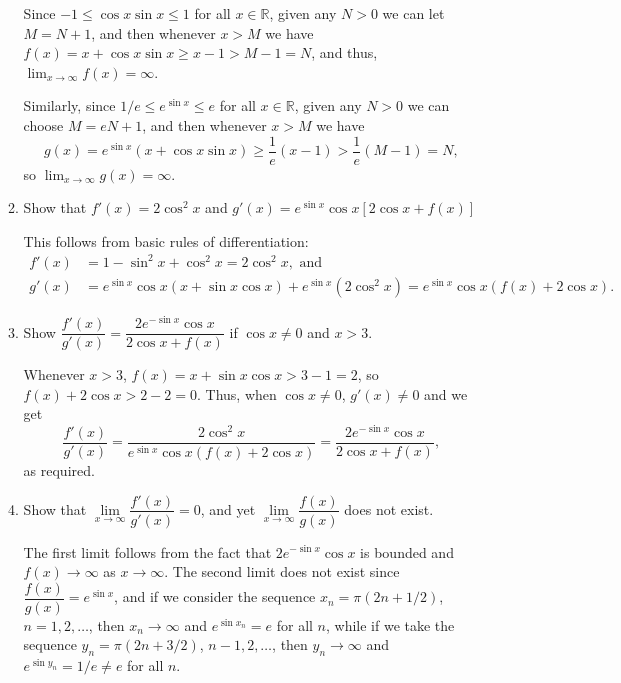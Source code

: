 \documentclass[letterpaper,12pt]{article}
\newcommand{\R}{\mathbb{R}}
\begin{document}
\begin{enumerate}
\begin{enumerate}
 \bigskip
 
 Since $-1\leq \cos x\sin x\leq 1$ for all $x\in \R$, given any $N>0$ we can let $M=N+1$, and then whenever $x>M$ we have $f(x)=x+\cos x\sin x\geq x-1 >M-1=N$, and thus, $\lim_{x\to\infty}f(x)=\infty$.
 
 Similarly, since $1/e\leq e^{\sin x}\leq e$ for all $x\in \R$, given any $N>0$ we can choose $M=eN+1$, and then whenever $x>M$ we have
 \[
 g(x) = e^{\sin x}(x +\cos x\sin x) \geq \frac{1}{e}(x-1)> \frac{1}{e}(M-1)=N,
 \]
 so $\lim_{x\to \infty}g(x)=\infty$.
 
 \bigskip
 
 \item Show that $f'(x)=2\cos^2x$ and $g'(x)=e^{\sin x}\cos x[2\cos x+f(x)]$
 
 \bigskip
 
This follows from basic rules of differentiation:
\begin{align*}
f'(x) &= 1-\sin^2x+\cos^2x = 2\cos^2x,\text{ and }\\
g'(x) &= e^{\sin x}\cos x(x+\sin x\cos x) + e^{\sin x}(2\cos^2 x) = e^{\sin x}\cos x(f(x)+2\cos x).
\end{align*}
 
 \bigskip
 
 \item Show $\dfrac{f'(x)}{g'(x)} = \dfrac{2e^{-\sin x}\cos x}{2\cos x+f(x)}$ if $\cos x\neq 0$ and $x>3$.
 
 \bigskip
 
 Whenever $x>3$, $f(x)=x+\sin x\cos x>3-1=2$, so $f(x)+2\cos x>2-2=0$. Thus, when $\cos x\neq 0$, $g'(x)\neq 0$ and we get
 \[
 \frac{f'(x)}{g'(x)} = \frac{2\cos^2 x}{e^{\sin x}\cos x(f(x)+2\cos x)} = \frac{2e^{-\sin x}\cos x}{2\cos x+f(x)},
 \]
 as required. 
 
 \bigskip
 
 \item Show that $\lim\limits_{x\to\infty}\dfrac{f'(x)}{g'(x)}=0$, and yet $\lim\limits_{x\to\infty}\dfrac{f(x)}{g(x)}$ does not exist.
 
 \bigskip
 
 The first limit follows from the fact that $2e^{-\sin x}\cos x$ is bounded and $f(x)\to \infty$ as $x\to \infty$. The second limit does not exist since $\dfrac{f(x)}{g(x)} = e^{\sin x}$, and if we consider the sequence $x_n = \pi(2n+1/2)$, $n=1,2,\ldots$, then $x_n\to\infty$ and $e^{\sin x_n} = e$ for all $n$, while if we take the sequence $y_n = \pi(2n+3/2)$, $n-1,2,\ldots$, then $y_n\to\infty$ and $e^{\sin y_n} = 1/e\neq e$ for all $n$.
 

\end{enumerate}
\end{enumerate}
\end{document}

